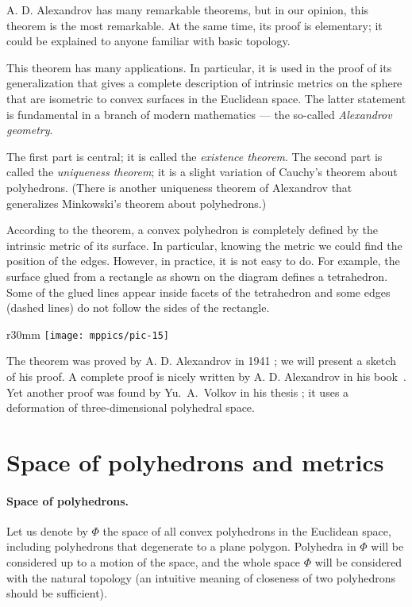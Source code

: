 A. D. Alexandrov has many remarkable theorems, but in our opinion, this theorem is the most remarkable.
At the same time, its proof is elementary;
it could be explained to anyone familiar with basic topology.

This theorem has many applications.
In particular, it is used in the proof of its generalization \cite{alexandrov-1948} that gives a complete description of intrinsic metrics on the sphere that are isometric to convex surfaces in the Euclidean space.
The latter statement is fundamental in a branch of modern mathematics --- the so-called \emph{Alexandrov geometry}.

The first part is central; it is called the \emph{existence theorem}.
The second part is called the \emph{uniqueness theorem}; it is a slight variation of Cauchy's theorem about polyhedrons.
(There is another uniqueness theorem of Alexandrov that generalizes Minkowski's theorem about  polyhedrons.)

According to the theorem, a convex polyhedron is completely defined by the intrinsic metric of its surface.
In particular, knowing the metric we could find the position of the edges.
However, in practice, it is not easy to do.
For example, the surface glued from a rectangle as shown on the diagram defines a tetrahedron.
Some of the glued lines appear inside facets of the tetrahedron and some edges (dashed lines) do not follow the sides of the rectangle.

{

\begin{wrapfigure}{r}{30mm}
\vskip-3mm
\centering
\texttt{[image: mppics/pic-15]}
\vskip-0mm
\end{wrapfigure}

The theorem was proved by A. D. Alexandrov in 1941 \cite{alexandrov-1941};
we will present a sketch of his proof.
A complete proof is nicely written by A. D. Alexandrov in his book~\cite{alexandrov}.
Yet another proof was found by Yu.~A.~Volkov in his thesis \cite{volkov};
it uses a deformation of three-dimensional polyhedral space.

}

\section{Space of polyhedrons and metrics}

\paragraph{Space of polyhedrons.}
Let us denote by $\Phi$ the space of all convex polyhedrons in the Euclidean space,
including polyhedrons that degenerate to a plane polygon.
Polyhedra in $\Phi$ will be considered up to a motion of the space, 
and the whole space $\Phi$ will be considered with the natural topology (an intuitive meaning of closeness of two polyhedrons should be sufficient).  

